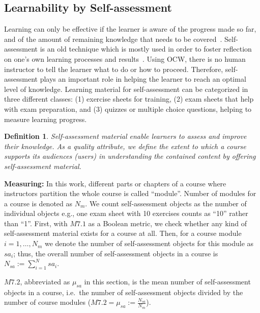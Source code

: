 \documentclass{sig-alternate}
\theoremstyle{definition}
\newtheorem{defn}{Definition}
\begin{document}
\subsection{Learnability by Self-assessment}
\label{sec:SA}
Learning can only be effective if the learner is aware of the progress made so far, and of the amount of remaining knowledge that needs to be covered~\parencite{Boud.1995}.
Self-assessment is an old technique which is mostly used in order to foster reflection on one's own learning processes and results~\parencite{Dunning.2004}.
Using OCW, there is no human instructor to tell the learner what to do or how to proceed.
Therefore, self-assessment plays an important role in helping the learner to reach an optimal level of knowledge.
Learning material for self-assessment can be categorized in three different classes: 
(1) exercise sheets for training, 
(2) exam sheets that help with exam preparation, and 
(3) quizzes or multiple choice questions, helping to measure learning progress.

\begin{defn}
\emph{Self-assessment material enable learners to assess and improve their knowledge.
As a quality attribute, we define the extent to which a course supports its audiences (users) in understanding the contained content by offering self-assessment material.}
\end{defn}

\noindent\textbf{Measuring:}
In this work, different parts or chapters of a course where instructors partition the whole course is called ``module''.
Number of modules for a course is denoted as $N_m$.
We count self-assessment objects as the number of individual objects e.g., one exam sheet with 10 exercises counts as ``10'' rather than ``1''.
First, with $M7.1$ as a Boolean metric, we check whether any kind of self-assessment material exists for a course at all.
Then, for a course module $i=1,\dots,N_m$ we denote the number of self-assessment objects for this module as $\mathit{sa}_i$; thus, the overall number of self-assessment objects in a course is $N_\mathit{sa}:=\sum_{i=1}^N \mathit{sa}_i$.

$M7.2$, abbreviated as $\mu_\mathit{sa}$ in this section, is the mean number of self-assessment objects in a course, i.e.\ the number of self-assessment objects divided by the number of course modules ($M7.2 =\mu_\mathit{sa}:=\frac{N_\mathit{sa}}{N_m}$).
\end{document}
